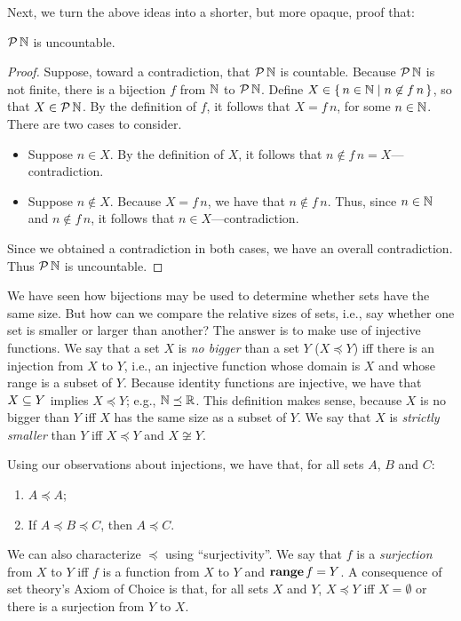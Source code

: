 Next, we turn the above ideas into a shorter, but more opaque, proof
that:

%
\begin{proposition}
\label{PowsetNatsUncountableProp}
${\cal P} \,\mathbb{N}$ is uncountable.
\end{proposition}

\begin{proof}
Suppose, toward a contradiction, that ${\cal P} \,\mathbb{N}$ is countable.
Because ${\cal P} \,\mathbb{N}$ is not finite, there is a bijection $f$
from $\mathbb{N}$ to ${\cal P} \,\mathbb{N}$.  Define
$X\in\{ \, n\in\mathbb{N} \mid n\not\in f\,n \, \}$, so that $X\in{\cal P} \,\mathbb{N}$.
By the definition of $f$, it follows that $X=f\,n$, for some
$n\in\mathbb{N}$.  There are two cases to consider.
\begin{itemize}
\item Suppose $n\in X$.  By the definition of $X$, it follows that
  $n\not\in f\,n=X$---contradiction.

\item Suppose $n\not\in X$.  Because $X=f\,n$, we have that $n\not\in
  f\,n$.  Thus, since $n\in\mathbb{N}$ and $n\not\in f\,n$, it follows
  that $n\in X$---contradiction.
\end{itemize}
Since we obtained a contradiction in both cases, we have
an overall contradiction. Thus ${\cal P} \,\mathbb{N}$ is uncountable.
\end{proof}

We have seen how bijections may be used to determine whether sets have
the same size.  But how can we compare the relative sizes of sets,
i.e., say whether one set is smaller or larger than another?  The
answer is to make use of injective functions.
%
%
We say that a set $X$ is \emph{no bigger} than a set $Y$ ($X\preceq Y$)
%
%
iff there is an injection from $X$ to $Y$, i.e., an
injective function whose domain is $X$ and whose range
is a subset of $Y$. Because identity functions are injective,
we have that $X\subseteq Y$ implies $X\preceq Y$; e.g.,
$\mathbb{N}\preceq\mathbb{R}$.  This definition makes sense, because $X$ is
no bigger than $Y$ iff $X$ has the same size as a subset of $Y$.
%
%
We say that $X$ is \emph{strictly smaller} than $Y$ iff
$X\preceq Y$ and $X\not\cong Y$.

Using our observations about injections, we have that,
for all sets $A$, $B$ and $C$:
\begin{enumerate}[\quad (1)]
\item $A\preceq A$;

\item If $A\preceq B\preceq C$, then $A\preceq C$.
\end{enumerate}
We can also characterize $\preceq$ using ``surjectivity''. We
say that $f$ is a \emph{surjection} from $X$ to $Y$ iff $f$ is a function
%
%
from $X$ to $Y$ and $\mathbf{range}\,f = Y$. A consequence of set theory's
Axiom of Choice is that, for all sets $X$ and $Y$, $X\preceq Y$ iff
%
$X = \emptyset$ or there is a surjection from $Y$ to $X$.

